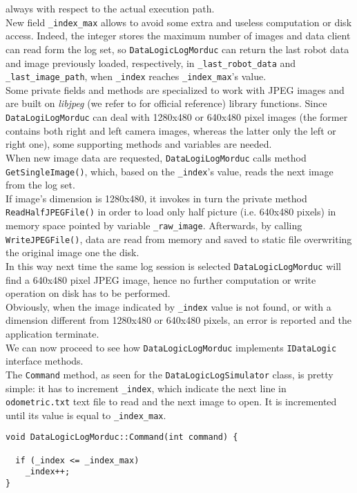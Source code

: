 always with respect to the actual execution path.
\\
New field \texttt{\_index\_max} allows to avoid some extra and
useless computation or disk access. Indeed, the integer stores
the maximum number
of images and data client can read form the log set, so
\texttt{DataLogicLogMorduc}  can
return the last robot data and image previously loaded, respectively,
in \texttt{\_last\_robot\_data} and \texttt{\_last\_image\_path},
when \texttt{\_index}
reaches \texttt{\_index\_max}'s value.
\\
Some private fields and methods are specialized to work with JPEG
images and are built on \textit{libjpeg} (we refer to \cite{library:libjpeg}
for official reference) library functions.
Since \texttt{DataLogiLogMorduc} can deal with 1280x480
or 640x480 pixel images (the former contains both right and left
camera images, whereas the latter only the left or right one),
some supporting methods and variables are needed.
\\
When new image data are requested, \texttt{DataLogiLogMorduc}
calls method \texttt{GetSingleImage()}, which, based on the
\texttt{\_index}'s value, reads the next image from the log set.
\\
If image's dimension is 1280x480, it invokes in turn the private method
\texttt{ReadHalfJPEGFile()} in order to load only half 
picture (i.e. 640x480 pixels) in memory space pointed by variable
\texttt{\_raw\_image}. Afterwards, by calling \texttt{WriteJPEGFile()},
data are read from memory and saved to static file overwriting the
original image one the disk.
\\
In this way next time the same log session is selected \texttt{DataLogicLogMorduc}
will find a 640x480 pixel JPEG image, hence no further computation
or write operation on disk has to be performed.
\\
Obviously, when the image indicated by \texttt{\_index} value is
not found, or with a dimension different from 1280x480 or
640x480 pixels, an error is reported and the application terminate.
\\
We can now proceed to see how \texttt{DataLogicLogMorduc} implements
\texttt{IDataLogic} interface methods.
\\
The \texttt{Command} method, as seen for the \texttt{DataLogicLogSimulator}
class, is pretty simple: it has to increment \texttt{\_index},
which indicate the next line in \texttt{odometric.txt}
text file to read and the next image to open. It is incremented until
its value is equal to \texttt{\_index\_max}.
\\
\begin{lstlisting}[caption={\texttt{DataLogicLogMorduc::Command() method}},
    label={code:datalogiclogmorduc:command}]
void DataLogicLogMorduc::Command(int command) {

  if (_index <= _index_max)
    _index++;
}
\end{lstlisting}


